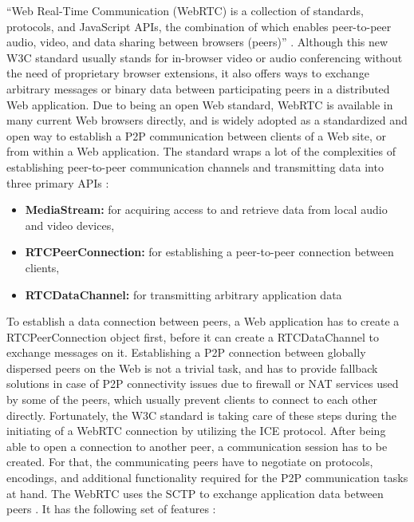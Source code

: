 ``Web Real-Time Communication (\gls{WebRTC}) is a collection of standards, protocols, and JavaScript \gls{API}s, the combination of which enables peer-to-peer audio, video, and data sharing between browsers (peers)'' \citep[pg. 307]{grigorik2013high}. Although this new \gls{W3C} standard usually stands for in-browser video or audio conferencing without the need of proprietary browser extensions, it also offers ways to exchange arbitrary messages or binary data between participating peers in a distributed Web application. Due to being an open Web standard, \gls{WebRTC} is available in many current Web browsers directly, and is widely adopted as a standardized and open way to establish a \gls{P2P} communication between clients of a Web site, or from within a Web application. The standard wraps a lot of the complexities of establishing peer-to-peer communication channels and transmitting data into three primary \gls{API}s \citep[pg. 307-308]{grigorik2013high}: \@

\begin{itemize}
	\item \textbf{MediaStream:} for acquiring access to and retrieve data from local audio and video devices,
	\item \textbf{RTCPeerConnection:} for establishing a peer-to-peer connection between clients,
	\item \textbf{RTCDataChannel:} for transmitting arbitrary application data
\end{itemize}

To establish a data connection between peers, a Web application has to create a RTCPeerConnection object first, before it can create a RTCDataChannel to exchange messages on it. Establishing a \gls{P2P} connection between globally dispersed peers on the Web is not a trivial task, and has to provide fallback solutions in case of \gls{P2P} connectivity issues due to firewall or \gls{NAT} services used by some of the peers, which usually prevent clients to connect to each other directly. Fortunately, the \gls{W3C} standard is taking care of these steps during the initiating of a \gls{WebRTC} connection by utilizing the \gls{ICE} protocol. After being able to open a connection to another peer, a communication session has to be created. For that, the communicating peers have to negotiate on protocols, encodings, and additional functionality required for the \gls{P2P} communication tasks at hand. The \gls{WebRTC} uses the \gls{SCTP} to exchange application data between peers \citep[pg. 315-330]{grigorik2013high}. It has the following set of features \citep[pg. 342]{grigorik2013high}: \@

